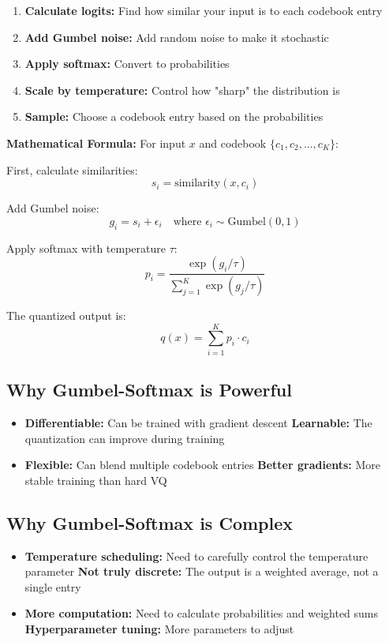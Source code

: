 \documentclass[12pt]{article}
\begin{document}
\begin{enumerate}
    \item \textbf{Calculate logits:} Find how similar your input is to each codebook entry
    \item \textbf{Add Gumbel noise:} Add random noise to make it stochastic
    \item \textbf{Apply softmax:} Convert to probabilities
    \item \textbf{Scale by temperature:} Control how "sharp" the distribution is
    \item \textbf{Sample:} Choose a codebook entry based on the probabilities
\end{enumerate}

\textbf{Mathematical Formula:} For input $x$ and codebook $\{c_1, c_2, ..., c_K\}$:

First, calculate similarities:
$$s_i = \text{similarity}(x, c_i)$$

Add Gumbel noise:
$$g_i = s_i + \epsilon_i \quad \text{where } \epsilon_i \sim \text{Gumbel}(0,1)$$

Apply softmax with temperature $\tau$:
$$p_i = \frac{\exp(g_i / \tau)}{\sum_{j=1}^K \exp(g_j / \tau)}$$

The quantized output is:
$$q(x) = \sum_{i=1}^K p_i \cdot c_i$$

\subsection{Why Gumbel-Softmax is Powerful}

\begin{itemize}
    \item \textbf{Differentiable:} Can be trained with gradient descent
    \textbf{Learnable:} The quantization can improve during training
    \item \textbf{Flexible:} Can blend multiple codebook entries
    \textbf{Better gradients:} More stable training than hard VQ
\end{itemize}

\subsection{Why Gumbel-Softmax is Complex}

\begin{itemize}
    \item \textbf{Temperature scheduling:} Need to carefully control the temperature parameter
    \textbf{Not truly discrete:} The output is a weighted average, not a single entry
    \item \textbf{More computation:} Need to calculate probabilities and weighted sums
    \textbf{Hyperparameter tuning:} More parameters to adjust
\end{itemize}
\end{document}
